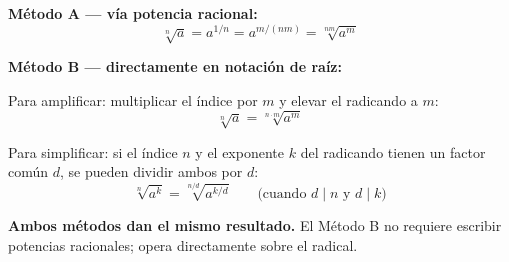 \documentclass[11pt, letterpaper]{article}
\begin{document}
\begin{tcolorbox}[importantbox, title={Cambio de índice — dos métodos equivalentes}]
\textbf{Método A — vía potencia racional:}
$$\sqrt[n]{a}=a^{1/n}=a^{m/(nm)}=\sqrt[nm]{a^m}$$

\textbf{Método B — directamente en notación de raíz:}

Para amplificar: multiplicar el índice por $m$ y elevar el radicando a $m$:
$$\sqrt[n]{a}=\sqrt[n\cdot m]{a^m}$$

Para simplificar: si el índice $n$ y el exponente $k$ del radicando tienen un factor común $d$, se pueden dividir ambos por $d$:
$$\sqrt[n]{a^k}=\sqrt[n/d]{a^{k/d}} \qquad\text{(cuando }d\mid n\text{ y }d\mid k\text{)}$$

\textbf{Ambos métodos dan el mismo resultado.} El Método B no requiere escribir potencias racionales; opera directamente sobre el radical.
\end{tcolorbox}
\end{document}
